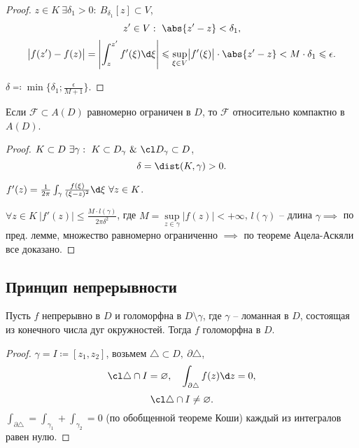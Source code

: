 \begin{proof}
	$z \in K \ \exists \delta _1 > 0: \ B_{\delta _1} [z]\subset V$,
	\[
		z ' \in V : \ \abs{z ' - z } < \delta _1,
	\]
	\[
		\big|f(z ') - f(z)\big| = \left|\int_{z}^{z '}f '(\xi )\d \xi \right| \leqslant \underset{\xi  \in V}{\sup} \big|f '(\xi )\big| \cdot \abs{z ' - z} < M \cdot \delta _1 \leqslant \epsilon .
	\]

	$\delta \eqcolon \min \{\delta _1 ; \frac{\epsilon }{M + 1} \}$.
\end{proof}

\begin{theorem}
	Если $\mathcal{F}\subset A(D)$ равномерно ограничен в $D$, то $\mathcal{F}$ относительно компактно в $A(D)$.
\end{theorem}

\begin{proof}
	$K \subset D \ \exists \gamma : \ K \subset D_{\gamma } \ \& \ \cl D_{\gamma } \subset D$,
	\[
		\delta = \dist(K,\gamma ) > 0.
	\]

	$f '(z) = \frac{1}{2\pi} \int_{\gamma } \frac{f(\xi )}{(\xi - z)^2} \d \xi \ \forall z \in K $.

	$\forall z \in K \ \big|f '(z)\big| \leqslant \frac{M \cdot l (\gamma )}{2\pi \delta ^2} $, где $M = \underset{z \in \gamma }{\sup} \big|f(z)\big| < +\infty $, $l (\gamma )$ -- длина $\gamma \implies $ по пред. лемме, множество равномерно ограниченно $\implies $ по теореме Ацела-Аскяли все доказано.
\end{proof}

\subsection{Принцип непрерывности}

\begin{theorem}
	Пусть $f$ непрерывно в $D$ и голоморфна в $D \setminus \gamma  $, где $\gamma $ -- ломанная в $D$, состоящая из конечного числа дуг окружностей. Тогда $f$ голоморфна в $D$.
\end{theorem}

\begin{proof}
	$\gamma = I \coloneq [z_1,z_2]$, возьмем $\triangle \subset D, \ \partial \triangle$,
	\[
		\cl \triangle \cap I = \varnothing , \quad \int_{\partial \triangle}f(z)\d z = 0,
	\]
	\[
		\cl \triangle \cap I \ne \varnothing .
	\]
	$\int_{\partial \triangle} = \int_{\gamma _1}  + \int_{\gamma _2} =0 $ (по обобщенной теореме Коши) каждый из интегралов равен нулю.
\end{proof}

